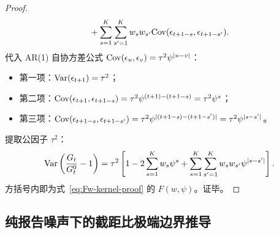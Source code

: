 \begin{proof}
\begin{align}
  &\quad + \sum_{s=1}^K \sum_{s'=1}^K w_s w_{s'} \mathrm{Cov}(\epsilon_{t+1-s}, \epsilon_{t+1-s'}).
\end{align}
代入 AR(1) 自协方差公式 $\mathrm{Cov}(\epsilon_u, \epsilon_v) = \tau^2 \psi^{|u-v|}$：
\begin{itemize}
  \item 第一项：$\mathrm{Var}(\epsilon_{t+1}) = \tau^2$；
  \item 第二项：$\mathrm{Cov}(\epsilon_{t+1}, \epsilon_{t+1-s}) = \tau^2 \psi^{(t+1) - (t+1-s)} = \tau^2 \psi^s$；
  \item 第三项：$\mathrm{Cov}(\epsilon_{t+1-s}, \epsilon_{t+1-s'}) = \tau^2 \psi^{|(t+1-s) - (t+1-s')|} = \tau^2 \psi^{|s - s'|}$。
\end{itemize}
提取公因子 $\tau^2$：
\begin{equation}
  \mathrm{Var}\left( \frac{G_t}{G_t^0} - 1 \right) = \tau^2 \left[ 1 - 2\sum_{s=1}^K w_s \psi^s + \sum_{s=1}^K \sum_{s'=1}^K w_s w_{s'} \psi^{|s - s'|} \right].
\end{equation}
方括号内即为式~\eqref{eq:Fw-kernel-proof} 的 $F(w, \psi)$。证毕。
\end{proof}

\subsection{纯报告噪声下的截距比极端边界推导}

